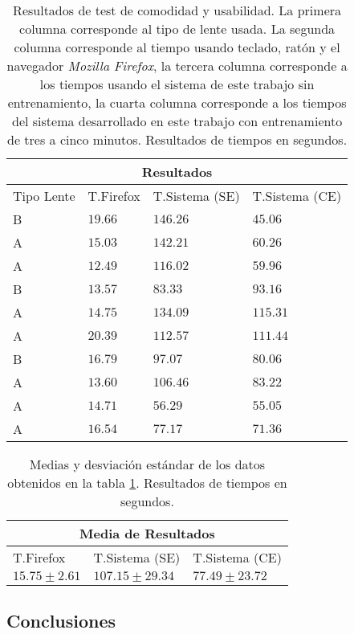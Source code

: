 \begin{table}[H]
	\centering
    \scriptsize
	\begin{tabular}{|l|l|l|l|}
		\hline
		\multicolumn{4}{|c|}{Resultados} \\ \hline
		Tipo Lente & T.Firefox & T.Sistema (SE) & T.Sistema (CE)\\
		\hline
		B & $19.66$ & $146.26$ & $45.06$\\ \hline
		A & $15.03$ & $142.21$ & $60.26$\\ \hline
		A & $12.49$ & $116.02$ & $59.96$\\ \hline
		B & $13.57$ & $83.33$ & $93.16$\\ \hline
		A & $14.75$ & $134.09$ & $115.31$\\ \hline
		A & $20.39$ & $112.57$ & $111.44$\\ \hline
		B & $16.79$ & $97.07$ & $80.06$\\ \hline
		A & $13.60$ & $106.46$ & $83.22$\\ \hline
		A & $14.71$ & $56.29$ & $55.05$\\ \hline
		A & $16.54$ & $77.17$ & $71.36$\\ \hline
	\end{tabular}
	\caption{Resultados de test de comodidad y usabilidad. La primera columna corresponde al tipo de lente usada. La segunda columna corresponde al tiempo usando teclado, rat\'on y el navegador \emph{Mozilla Firefox}, la tercera columna corresponde a los tiempos usando el sistema de este trabajo sin entrenamiento, la cuarta columna corresponde a los tiempos del sistema desarrollado en este trabajo con entrenamiento de tres a cinco minutos. Resultados de tiempos en segundos. }
	\label{tabla:test2}
\end{table}

\begin{table}[H]
	\centering
    \scriptsize
	\begin{tabular}{|l|l|l|}
		\hline
		\multicolumn{3}{|c|}{Media de Resultados} \\ \hline
		T.Firefox & T.Sistema (SE) & T.Sistema (CE)\\
		\hline
		$15.75 \pm 2.61$ & $107.15 \pm 29.34$ & $77.49 \pm 23.72$\\ \hline
	\end{tabular}
	\caption{Medias y desviaci\'on est\'andar de los datos obtenidos en la tabla \ref{tabla:test2}. Resultados de tiempos en segundos. }
	\label{tabla:test3}
\end{table}
\subsection{Conclusiones}

